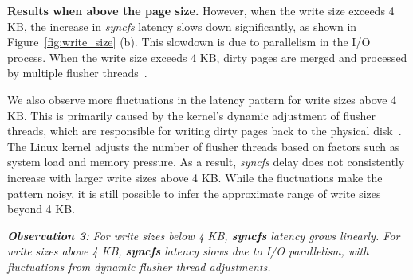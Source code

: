 \textbf{Results when above the page size.} However, when the write size exceeds 4 KB, the increase in \textit{syncfs} latency slows down significantly, as shown in Figure~\ref{fig:write_size} (b). This slowdown is due to parallelism in the I/O process. When the write size exceeds 4 KB, dirty pages are merged and processed by multiple flusher threads~\cite{linux_flusher}. 

We also observe more fluctuations in the latency pattern for write sizes above 4 KB. This is primarily caused by the kernel’s dynamic adjustment of flusher threads, which are responsible for writing dirty pages back to the physical disk~\cite{mario2017low}. The Linux kernel adjusts the number of flusher threads based on factors such as system load and memory pressure. As a result, \textit{syncfs} delay does not consistently increase with larger write sizes above 4 KB. While the fluctuations make the pattern noisy, it is still possible to infer the approximate range of write sizes beyond 4 KB. 










\begin{tcolorbox}[colback=gray!10,colframe=black,boxrule=0.5pt,arc=2mm,outer arc=2mm,]
\textit{\textbf{Observation 3}:  For write sizes below 4 KB, \textit{\textbf{syncfs}} latency grows linearly. For write sizes above 4 KB, \textit{\textbf{syncfs}} latency slows due to I/O parallelism, with fluctuations from dynamic flusher thread adjustments. }
\end{tcolorbox}







